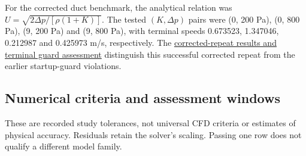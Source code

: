 For the corrected duct benchmark, the analytical relation was \(U=\sqrt{2\Delta p/[\rho(1+K)]}\). The tested \((K,\Delta p)\) pairs were (0, 200 Pa), (0, 800 Pa), (9, 200 Pa) and (9, 800 Pa), with terminal speeds 0.673523, 1.347046, 0.212987 and 0.425973 m/s, respectively. The \href{https://github.com/Shuhei-uni/P4P_knowledgeWiki/blob/main/Project/experiments/phase-09-steady-vof-pool/follow-on-diagnostics/drainage-boundary-verification/results.md}{corrected-repeat results and terminal guard assessment} distinguish this successful corrected repeat from the earlier startup-guard violations.

\subsection{Numerical criteria and assessment windows}

These are recorded study tolerances, not universal CFD criteria or estimates of physical accuracy. Residuals retain the solver's scaling. Passing one row does not qualify a different model family.

